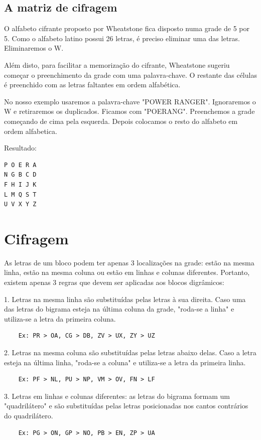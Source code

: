 \documentclass[12pt]{article}
\begin{document}
\subsection{A matriz de cifragem}

O alfabeto cifrante proposto por Wheatstone fica disposto numa grade de 5 por 5. Como o alfabeto latino possui 26 letras, é preciso eliminar uma das letras. Eliminaremos o W. 

Além disto, para facilitar a memorização do cifrante, Wheatstone sugeriu começar o preenchimento da grade com uma palavra-chave. O restante das células é preenchido com as letras faltantes em ordem alfabética.

No nosso exemplo usaremos a palavra-chave "POWER RANGER". Ignoraremos o W e retiraremos os duplicados. Ficamos com "POERANG". Preenchemos a
grade começando de cima pela esquerda. Depois
colocamos o resto do alfabeto em ordem alfabetica.

Resultado:
\begin{verbatim}
P O E R A
N G B C D
F H I J K
L M Q S T 
U V X Y Z
\end{verbatim}

\section{Cifragem}
As letras de um bloco podem ter apenas 3 localizações na grade: estão na mesma linha, estão na mesma coluna ou estão em linhas e colunas diferentes. Portanto, existem apenas 3 regras que devem ser aplicadas aos blocos digrâmicos:

1. Letras na mesma linha são substituídas pelas letras à sua direita. Caso uma das letras do bigrama esteja na última coluna da grade, "roda-se a linha" e utiliza-se a letra da primeira coluna.
\begin{verbatim}
    Ex: PR > OA, CG > DB, ZV > UX, ZY > UZ
\end{verbatim}
2. Letras na mesma coluna são substituídas pelas letras abaixo delas. Caso a letra esteja na última linha, "roda-se a coluna" e utiliza-se a letra da primeira linha.
\begin{verbatim}
    Ex: PF > NL, PU > NP, VM > OV, FN > LF
\end{verbatim}
3. Letras em linhas e colunas diferentes: as letras do bigrama formam um "quadrilátero" e são substituídas pelas letras posicionadas nos cantos contrários do quadrilátero.
\begin{verbatim}
    Ex: PG > ON, GP > NO, PB > EN, ZP > UA
\end{verbatim}
\end{document}
